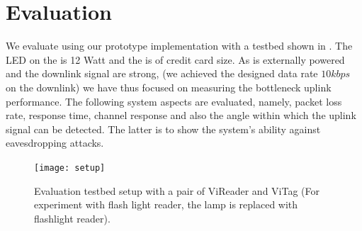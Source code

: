 \section{Evaluation}
\label{sec:eva}

We evaluate \retro using our prototype implementation with a testbed shown in . The LED on the \reader is 12 Watt and the \vitag is of credit card size. As \reader is externally powered and the downlink signal are strong, (we achieved the designed data rate $10kbps$ on the downlink) we have thus focused on measuring the bottleneck uplink performance. The following system aspects are evaluated, namely, packet loss rate, response time, channel response and also the angle within which the uplink signal can be detected. The latter is to show the \retro system's ability against eavesdropping attacks. 



\begin{figure}[tb!]
\centering
\texttt{[image: setup]}
\vskip -0.05in
\caption{Evaluation testbed setup with a pair of ViReader and ViTag (For experiment with flash light reader, the lamp is replaced with flashlight reader).}
\label{fig:setup}
\vskip -0.05in
\end{figure}

%
%
%
